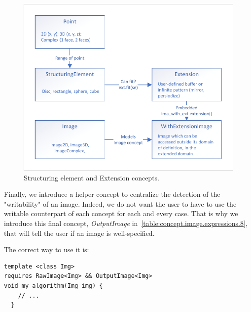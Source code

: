 \begin{figure}[tbh]
  \centering
  \includegraphics[width=.8\linewidth]{figs/concepts/se_extension.pdf}
  \caption{Structuring element and Extension concepts.}
  \label{fig:concept.se_extension}
\end{figure}

Finally, we introduce a helper concept to centralize the detection of the "writability" of an image. Indeed, we do not
want the user to have to use the writable counterpart of each concept for each and every case. That is why we introduce
this final concept, \emph{OutputImage} in~\cref{table:concept.image.expressions.8}, that will tell the user if an image
is well-specified.

The correct way to use it is:
\begin{verbatim}
template <class Img>
requires RawImage<Img> && OutputImage<Img>
void my_algorithm(Img img) {
    // ...
  }
\end{verbatim}
